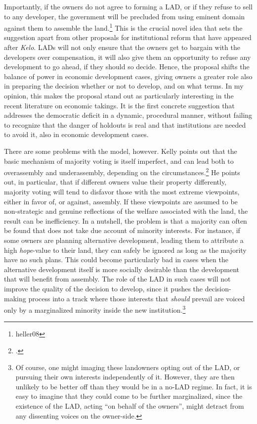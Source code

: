 Importantly, if the owners do not agree to forming a LAD, or if they refuse to sell to any developer, the government will be precluded from using eminent domain against them to assemble the land.\footnote[1491]{heller08} This is the crucial novel idea that sets the suggestion apart from other proposals for institutional reform that have appeared after {\it Kelo}. LADs will not only ensure that the owners get to bargain with the developers over compensation, it will also give them an opportunity to refuse any development to go ahead, if they should so decide. Hence, the proposal shifts the balance of power in economic development cases, giving owners a greater role also in preparing the decision whether or not to develop, and on what terms. In my opinion, this makes the proposal stand out as particularly interesting in the recent literature on economic takings. It is the first concrete suggestion that addresses the democratic deficit in a dynamic, procedural manner, without failing to recognize that the danger of holdouts is real and that institutions are needed to avoid it, also in economic development cases.

There are some problems with the model, however. Kelly points out that the basic mechanism of majority voting is itself imperfect, and can lead both to overassembly and underassembly, depending on the circumstances.\footcite{kelly09} He points out, in particular, that if different owners value their property differently, majority voting will tend to disfavor those with the most extreme viewpoints, either in favor of, or against, assembly. If these viewpoints are assumed to be non-strategic and genuine reflections of the welfare associated with the land, the result can be inefficiency. In a nutshell, the problem is that a majority can often be found that does not take due account of minority interests. For instance, if some owners are planning alternative development, leading them to attribute a high {\it hope}-value to their land, they can safely be ignored as long as the majority have no such plans. This could become particularly bad in cases when the alternative development itself is more socially desirable than the development that will benefit from assembly. The role of the LAD in such cases will not improve the quality of the decision to develop, since it pushes the decision-making process into a track where those interests that {\it should} prevail are voiced only by a marginalized minority inside the new institution.\footnote{Of course, one might imaging these landowners opting out of the LAD, or pursuing their own interests independently of it. However, they are then unlikely to be better off than they would be in a no-LAD regime. In fact, it is easy to imagine that they could come to be further marginalized, since the existence of the LAD, acting ``on behalf of the owners'', might detract from any dissenting voices on the owner-side.}

